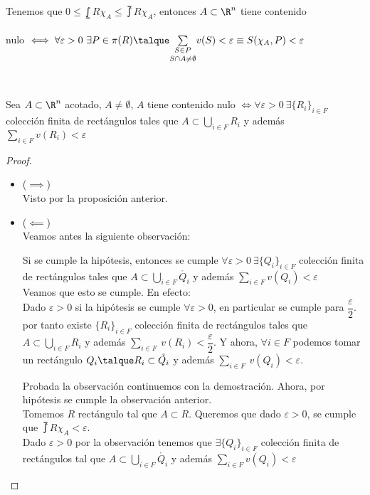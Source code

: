 	\begin{proposicion} Tenemos que $0\leq \lowint{}{R}\chi_A\leq\upint{}{R} \chi_A$, entonces $A\subset\R^n$ tiene contenido \\\\ nulo $\iff\forall\varepsilon>0\ \exists P\in\pi(R)\talque \underset{S\cap A\neq\emptyset}{\underset{S\in P}\sum}v(S)<\varepsilon\equiv S(\chi_A,P)<\varepsilon$ 
	\end{proposicion}
	\ \\
	\begin{teor} Sea $A\subset \R^n$ acotado, $A\neq\emptyset$, $A$ tiene contenido nulo $\iff\forall\varepsilon>0\ \exists \{R_i\}_{i\in F}$ colección finita de rectángulos tales que $A\subset \underset{i\in F}\bigcup R_i$ y además $\underset{i\in F}\sum v(R_i)<\varepsilon$
	\begin{proof}\ 
	\begin{itemize}
	\item ($\implies$)\\
	Visto por la proposición anterior.
	\item ($\impliedby$)\\
	Veamos antes la siguiente observación:	
	\begin{observacion} Si se cumple la hipótesis, entonces se cumple $\forall\varepsilon>0\ \exists\{Q_i\}_{i\in F}$ colección finita de rectángulos tales que $A\subset\underset{i\in F}\bigcup\mathring{Q_i}$ y además $\underset{i\in F}\sum v(Q_i)<\varepsilon$\\
	Veamos que esto se cumple. En efecto:\\
	Dado $\varepsilon>0$ si la hipótesis se cumple $\forall\varepsilon >0$, en particular se cumple para $\dfrac{\varepsilon}{2}$. por tanto existe $\{R_i\}_{i\in F}$ colección finita de rectángulos tales que $A\subset\underset{i\in F}\bigcup R_i$ y además $\underset{i\in F}\sum\ v(R_i)<\dfrac{\varepsilon}{2}$. Y ahora, $\forall i\in F$ podemos tomar un rectángulo $Q_i\talque R_i\subset\mathring{Q_i}$ y además $\underset{i\in F}\sum\ v(Q_i)<\varepsilon$.
	\end{observacion}
	Probada la observación continuemos con la demostración. Ahora, por hipótesis se cumple la observación anterior.\\
	Tomemos $R$ rectángulo tal que $A\subset R$. Queremos que dado $\varepsilon >0$, se cumple que $\upint{}{R}\chi_A <\varepsilon$.\\
	Dado $\varepsilon>0$ por la observación tenemos que $\exists\{Q_i\}_{i\in F}$ colección finita de rectángulos tal que $A\subset\underset{i\in F}\bigcup\mathring{Q_i}$ y además $\underset{i\in F}\sum v(Q_i)<\varepsilon$\\

\end{itemize}
\end{proof}
\end{teor}
